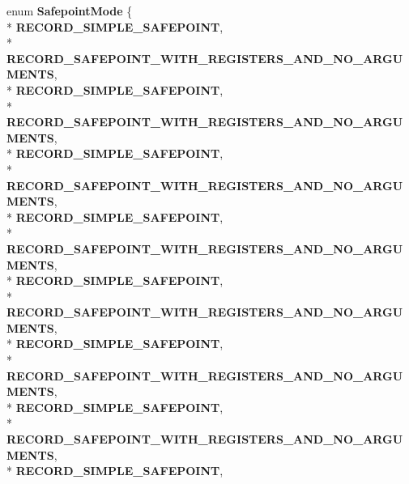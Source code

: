 \begin{DoxyCompactItemize}
\item 
enum {\bfseries Safepoint\+Mode} \{ \\*
{\bfseries R\+E\+C\+O\+R\+D\+\_\+\+S\+I\+M\+P\+L\+E\+\_\+\+S\+A\+F\+E\+P\+O\+I\+NT}, 
\\*
{\bfseries R\+E\+C\+O\+R\+D\+\_\+\+S\+A\+F\+E\+P\+O\+I\+N\+T\+\_\+\+W\+I\+T\+H\+\_\+\+R\+E\+G\+I\+S\+T\+E\+R\+S\+\_\+\+A\+N\+D\+\_\+\+N\+O\+\_\+\+A\+R\+G\+U\+M\+E\+N\+TS}, 
\\*
{\bfseries R\+E\+C\+O\+R\+D\+\_\+\+S\+I\+M\+P\+L\+E\+\_\+\+S\+A\+F\+E\+P\+O\+I\+NT}, 
\\*
{\bfseries R\+E\+C\+O\+R\+D\+\_\+\+S\+A\+F\+E\+P\+O\+I\+N\+T\+\_\+\+W\+I\+T\+H\+\_\+\+R\+E\+G\+I\+S\+T\+E\+R\+S\+\_\+\+A\+N\+D\+\_\+\+N\+O\+\_\+\+A\+R\+G\+U\+M\+E\+N\+TS}, 
\\*
{\bfseries R\+E\+C\+O\+R\+D\+\_\+\+S\+I\+M\+P\+L\+E\+\_\+\+S\+A\+F\+E\+P\+O\+I\+NT}, 
\\*
{\bfseries R\+E\+C\+O\+R\+D\+\_\+\+S\+A\+F\+E\+P\+O\+I\+N\+T\+\_\+\+W\+I\+T\+H\+\_\+\+R\+E\+G\+I\+S\+T\+E\+R\+S\+\_\+\+A\+N\+D\+\_\+\+N\+O\+\_\+\+A\+R\+G\+U\+M\+E\+N\+TS}, 
\\*
{\bfseries R\+E\+C\+O\+R\+D\+\_\+\+S\+I\+M\+P\+L\+E\+\_\+\+S\+A\+F\+E\+P\+O\+I\+NT}, 
\\*
{\bfseries R\+E\+C\+O\+R\+D\+\_\+\+S\+A\+F\+E\+P\+O\+I\+N\+T\+\_\+\+W\+I\+T\+H\+\_\+\+R\+E\+G\+I\+S\+T\+E\+R\+S\+\_\+\+A\+N\+D\+\_\+\+N\+O\+\_\+\+A\+R\+G\+U\+M\+E\+N\+TS}, 
\\*
{\bfseries R\+E\+C\+O\+R\+D\+\_\+\+S\+I\+M\+P\+L\+E\+\_\+\+S\+A\+F\+E\+P\+O\+I\+NT}, 
\\*
{\bfseries R\+E\+C\+O\+R\+D\+\_\+\+S\+A\+F\+E\+P\+O\+I\+N\+T\+\_\+\+W\+I\+T\+H\+\_\+\+R\+E\+G\+I\+S\+T\+E\+R\+S\+\_\+\+A\+N\+D\+\_\+\+N\+O\+\_\+\+A\+R\+G\+U\+M\+E\+N\+TS}, 
\\*
{\bfseries R\+E\+C\+O\+R\+D\+\_\+\+S\+I\+M\+P\+L\+E\+\_\+\+S\+A\+F\+E\+P\+O\+I\+NT}, 
\\*
{\bfseries R\+E\+C\+O\+R\+D\+\_\+\+S\+A\+F\+E\+P\+O\+I\+N\+T\+\_\+\+W\+I\+T\+H\+\_\+\+R\+E\+G\+I\+S\+T\+E\+R\+S\+\_\+\+A\+N\+D\+\_\+\+N\+O\+\_\+\+A\+R\+G\+U\+M\+E\+N\+TS}, 
\\*
{\bfseries R\+E\+C\+O\+R\+D\+\_\+\+S\+I\+M\+P\+L\+E\+\_\+\+S\+A\+F\+E\+P\+O\+I\+NT}, 
\\*
{\bfseries R\+E\+C\+O\+R\+D\+\_\+\+S\+A\+F\+E\+P\+O\+I\+N\+T\+\_\+\+W\+I\+T\+H\+\_\+\+R\+E\+G\+I\+S\+T\+E\+R\+S\+\_\+\+A\+N\+D\+\_\+\+N\+O\+\_\+\+A\+R\+G\+U\+M\+E\+N\+TS}, 
\\*
{\bfseries R\+E\+C\+O\+R\+D\+\_\+\+S\+I\+M\+P\+L\+E\+\_\+\+S\+A\+F\+E\+P\+O\+I\+NT}, 

\end{DoxyCompactItemize}
